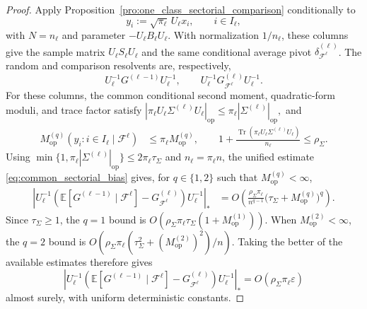 \documentclass[EJP, preprint, NODS, nobera, nofontexpansion]{ejpecp}
\DeclareMathOperator{\op}{op}
\DeclareMathOperator{\tr}{Tr}
\begin{document}
\begin{proof}
Apply Proposition~\ref{pro:one_class_sectorial_comparison} conditionally to
\[
    y_i:=\sqrt{\pi_{\ell}}\,U_{\ell}x_i,
    \qquad i\in I_{\ell},
\]
with $N=n_{\ell}$ and parameter $-U_{\ell}B_{\ell}U_{\ell}$. With normalization $1/n_{\ell}$,
these columns give the sample matrix $U_{\ell}S_{\ell}U_{\ell}$ and the same
conditional average pivot $\widehat\delta_{\mathcal F^{\ell}}^{(\ell)}$.
The random and comparison resolvents are, respectively,
\[
    U_{\ell}^{-1}G^{(\ell-1)}U_{\ell}^{-1},
    \qquad
    U_{\ell}^{-1}G_{\mathcal F^{\ell}}^{(\ell)}U_{\ell}^{-1}.
\]
For these columns, the common conditional second moment,
quadratic-form moduli, and trace factor satisfy $|\pi_{\ell}U_{\ell}\Sigma^{(\ell)}U_{\ell}|_{\op}
    \leq\pi_{\ell}|\Sigma^{(\ell)}|_{\op},$ and
\begin{align*}
    M_{\op}^{(q)}(y_i:i\in I_{\ell}\mid\mathcal F^{\ell})
    &\leq\pi_{\ell}M_{\op}^{(q)},
    \qquad 
    1+\frac{\tr(\pi_{\ell}U_{\ell}\Sigma^{(\ell)}U_{\ell})}{n_{\ell}}
    \leq\rho_\Sigma.
\end{align*}
Using $\min\{1,\pi_{\ell}|\Sigma^{(\ell)}|_{\op}\}
    \leq2\pi_{\ell}\tau_\Sigma$ and $n_{\ell}=\pi_{\ell} n$, 
the unified estimate \eqref{eq:common_sectorial_bias} gives,
for $q\in\{1,2\}$ such that
$M_{\op}^{(q)}<\infty$,
\begin{align*}
    \left|
        U_{\ell}^{-1}\left(
            \mathbb E[G^{(\ell-1)}\mid\mathcal F^{\ell}]
            -G_{\mathcal F^{\ell}}^{(\ell)}
        \right)U_{\ell}^{-1}
    \right|_*
    &=O\!\left(
        \frac{\rho_\Sigma\pi_{\ell}}{n^{q-1}}
        \bigl(\tau_\Sigma+M_{\op}^{(q)}\bigr)^q
    \right).
\end{align*}
Since $\tau_\Sigma\geq1$, the $q=1$ bound is
$O(\rho_\Sigma\pi_{\ell}\tau_\Sigma(1+M_{\op}^{(1)}))$.
When $M_{\op}^{(2)}<\infty$, the $q=2$ bound is
$O(\rho_\Sigma\pi_{\ell}(\tau_\Sigma^2+(M_{\op}^{(2)})^2)/n)$.
Taking the better of the available estimates therefore gives
\begin{equation}
    \left|
        U_{\ell}^{-1}\left(
            \mathbb E[G^{(\ell-1)}\mid\mathcal F^{\ell}]
            -G_{\mathcal F^{\ell}}^{(\ell)}
        \right)U_{\ell}^{-1}
    \right|_*
    =O\!\left(\rho_\Sigma\pi_{\ell}\varepsilon\right)
\end{equation}
almost surely, with uniform deterministic constants.


\end{proof}
\end{document}
